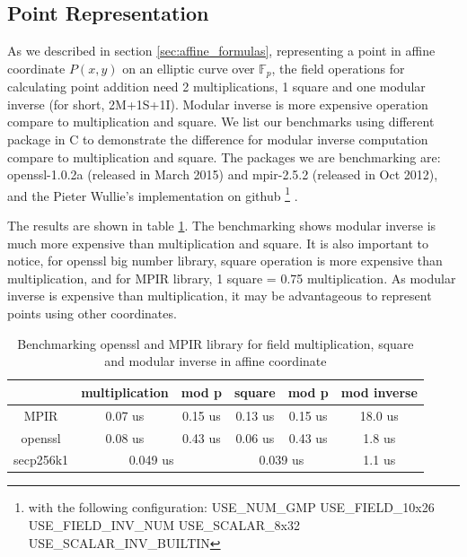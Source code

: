 \subsection{Point Representation} \label{sec:pointRep}
As we described in section \ref{sec:affine_formulas}, representing a point in affine coordinate $P(x,y)$ on an elliptic curve over $\mathbb{F}_p$, the field operations for calculating point addition need 2 multiplications, 1 square and one modular inverse (for short, 2M+1S+1I). Modular inverse is more expensive operation compare to multiplication and square. We list our benchmarks using different package in C to demonstrate the difference for modular inverse computation compare to multiplication and square. The packages we are benchmarking are: openssl-1.0.2a (released in March 2015) and mpir-2.5.2 (released in Oct 2012), and the Pieter Wullie's implementation on github \cite{Wulliesecp256k1} \footnote{with the following configuration: USE\_NUM\_GMP USE\_FIELD\_10x26 USE\_FIELD\_INV\_NUM USE\_SCALAR\_8x32 USE\_SCALAR\_INV\_BUILTIN} . 


 The results are shown in table \ref{table:benchmark_msi_affine}. The benchmarking shows modular inverse is much more expensive than multiplication and square. It is also important to notice, for openssl big number library, square operation is more expensive than multiplication, and for MPIR library, 1 square = 0.75 multiplication. As modular inverse is expensive than multiplication, it may be advantageous to represent points using other coordinates.
 
 \begin{table}[]
 	\centering
 	\caption{Benchmarking openssl and MPIR library for field multiplication, square and modular inverse in affine coordinate}
 	\label{table:benchmark_msi_affine}
 	\begin{tabular}{|c|c|c|c|c|c|}
 		\hline
 		& multiplication     & mod p    & square         & mod p        & mod inverse \\ \hline
 		MPIR      & 0.07 us            & 0.15 us    & 0.13 us        & 0.15 us        & 18.0 us     \\ \hline
 		openssl   & 0.08 us            & 0.43 us    & 0.06 us        & 0.43 us        & 1.8 us      \\ \hline
 		secp256k1 & \multicolumn{2}{c|}{0.049 us} & \multicolumn{2}{c|}{0.039 us} & 1.1 us      \\ \hline
 	\end{tabular}
 \end{table}

